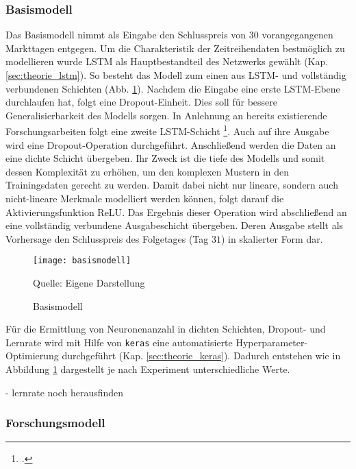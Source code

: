 \subsubsection*{Basismodell}\label{sec:modellierung_basis_goog}

Das Basismodell nimmt als Eingabe den Schlusspreis von $30$ vorangegangenen Markttagen entgegen. Um die Charakteristik der Zeitreihendaten bestmöglich zu modellieren wurde \ac{LSTM} als Hauptbestandteil des Netzwerks gewählt (Kap. \ref{sec:theorie_lstm}). So besteht das Modell zum einen aus LSTM- und vollständig verbundenen Schichten (Abb. \ref{fig:basismodell}). 
Nachdem die Eingabe eine erste \ac{LSTM}-Ebene durchlaufen hat, folgt eine Dropout-Einheit. Dies soll für bessere Generalisierbarkeit des Modells sorgen. In Anlehnung an bereits existierende Forschungsarbeiten folgt eine zweite \ac{LSTM}-Schicht \footcite[Kap. 4.2.1]{guan2020stockprice}. Auch auf ihre Ausgabe wird eine Dropout-Operation durchgeführt. Anschließend werden die Daten an eine dichte Schicht übergeben. Ihr Zweck ist die tiefe des Modells und somit dessen Komplexität zu erhöhen, um den komplexen Mustern in den Trainingsdaten gerecht zu werden. Damit dabei nicht nur lineare, sondern auch nicht-lineare Merkmale modelliert werden können, folgt darauf die Aktivierungsfunktion \ac{ReLU}. Das Ergebnis dieser Operation wird abschließend an eine vollständig verbundene Ausgabeschicht übergeben. Deren Ausgabe stellt als Vorhersage den Schlusspreis des Folgetages (Tag $31$) in skalierter Form dar.
\begin{figure}[h]
	\centering
	\caption{Basismodell}
	\texttt{[image: basismodell]}
	\label{fig:basismodell}
	\vspace{-1.0em}
	\begin{flushleft}
		\small{Quelle: Eigene Darstellung}
	\end{flushleft}
\end{figure}
Für die Ermittlung von Neuronenanzahl in dichten Schichten, Dropout- und Lernrate wird mit Hilfe von \texttt{keras} eine automatisierte Hyperparameter-Optimierung durchgeführt (Kap. \ref{sec:theorie_keras}). Dadurch entstehen wie in Abbildung \ref{fig:basismodell} dargestellt je nach Experiment unterschiedliche Werte.

- lernrate noch herausfinden


\subsubsection*{Forschungsmodell}\label{sec:modellierung_forsch}

